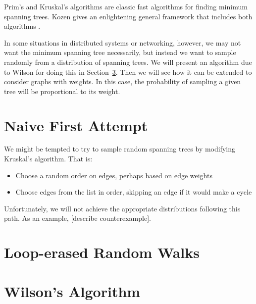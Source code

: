 \documentclass[11pt]{article}
\begin{document}
Prim's and Kruskal's algorithms are classic fast algorithms for finding minimum
spanning trees. Kozen gives an enlightening general framework that includes both
algorithms \cite{kozen}.

In some situations in distributed systems or networking, however, we may not
want the minimum spanning tree necessarily, but instead we want to sample
randomly from a distribution of spanning trees. We will present an algorithm due
to Wilson \cite{wilson} for doing this in Section~\ref{wilson}. Then we will see
how it can be extended to consider graphs with weights. In this case, the
probability of sampling a given tree will be proportional to its weight.



\section{Naive First Attempt}

We might be tempted to try to sample random spanning trees by modifying
Kruskal's algorithm. That is:
\begin{itemize}
\item Choose a random order on edges, perhaps based on edge weights
\item Choose edges from the list in order, skipping an edge if it would make a
cycle
\end{itemize}

Unfortunately, we will not achieve the appropriate distributions following this
path. As an example, [describe counterexample].

\section{Loop-erased Random Walks}



\section{Wilson's Algorithm}\label{wilson}
\end{document}
